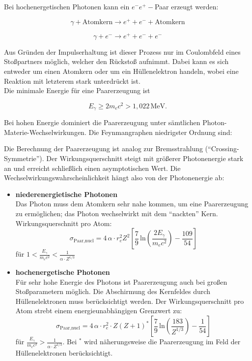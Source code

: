 Bei hochenergetischen Photonen kann ein $e^-e^+-$Paar erzeugt werden:

\[\gamma + \text{Atomkern} \longrightarrow e^+ + e^- +  \text{Atomkern} \]

\[\gamma + e^- \longrightarrow e^+ + e^- +  e^- \]

Aus Gründen der Impulserhaltung ist dieser Prozess nur im Coulombfeld eines Stoßpartners möglich,
welcher den Rückstoß aufnimmt. Dabei kann es sich entweder um einen Atomkern oder um ein
Hüllenelektron handeln, wobei eine Reaktion mit letzterem stark unterdrückt ist. 
\\
Die minimale Energie für eine Paarerzeugung ist

\[ E_\gamma \geq 2m_ec^2 > 1{,}022\,\text{MeV}. \]

Bei hohen Energie dominiert die Paarerzeugung unter sämtlichen Photon-Materie-Wechselwirkungen. Die
Feynmangraphen niedrigster Ordnung sind:

\begin{figure}[H]
		\centering
		
\end{figure}

Die Berechnung der Paarerzeugung ist analog zur Bremsstrahlung ("`Crossing-Symmetrie"'). Der
Wirkungsquerschnitt steigt mit größerer Photonenergie stark an und erreicht schließlich einen
asymptotischen Wert. Die Wechselwirkungswahrscheinlichkeit hängt also von der Photonenergie ab:

\begin{itemize}
  \item \textbf{niederenergietische Photonen}\\
  Das Photon muss dem Atomkern sehr nahe kommen, um eine Paarerzeugung zu ermöglichen; das Photon
  wechselwirkt mit dem "`nackten"' Kern. Wirkungsquerschnitt pro Atom:
  \[\sigma_{\text{Paar,nucl}} = 4\,\alpha\cdot r_e^2 Z^2
  \left[\frac{7}{9}\,\text{ln}\left(\frac{2E_\gamma}{m_ec^2}\right)-\frac{109}{54}  \right]  \]
  für $1< \frac{E_\gamma}{m_ec^2} < \frac{1}{\alpha\cdot Z^{1/3}}$
  \item \textbf{hochenergetische Photonen}\\
  Für sehr hohe Energie des Photons ist Paarerzeugung auch bei großen Stoßparametern möglich. Die
  Abschirmung des Kernfeldes durch Hüllen\-elektronen muss berücksichtigt werden. Der
  Wirkungsquerschnitt pro Atom strebt einem energieunabhängigen Grenzwert zu:
  \[\sigma_{\text{Paar,nucl}} = 4\,\alpha\cdot r_e^2\cdot Z(Z+1)^*
  \left[\frac{7}{9}\,\text{ln}\left(\frac{183}{Z^{1/3}}\right)-\frac{1}{54}  \right]  \]
  für $\frac{E_\gamma}{m_ec^2} > \frac{1}{\alpha\cdot Z^{1/3}}$. Bei $^*$ wird näherungsweise die
  Paarerzeugung im Feld der Hüllenelektronen berücksichtigt.
\end{itemize}


